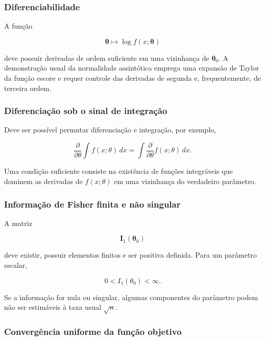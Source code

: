 \documentclass[
  letterpaper,
  DIV=11,
  numbers=noendperiod]{scrreprt}
\begin{document}
\subsubsection{Diferenciabilidade}\label{diferenciabilidade}

A função

\[\boldsymbol\theta
\longmapsto
\log f(x;\boldsymbol\theta)\]

deve possuir derivadas de ordem suficiente em uma vizinhança de
\(\boldsymbol\theta_0\). A demonstração usual da normalidade assintótica
emprega uma expansão de Taylor da função escore e requer controle das
derivadas de segunda e, frequentemente, de terceira ordem.

\subsubsection{Diferenciação sob o sinal de
integração}\label{diferenciauxe7uxe3o-sob-o-sinal-de-integrauxe7uxe3o}

Deve ser possível permutar diferenciação e integração, por exemplo,

\[\frac{\partial}{\partial\theta}
\int f(x;\theta)\,dx
=
\int
\frac{\partial}{\partial\theta}
f(x;\theta)\,dx.\]

Uma condição suficiente consiste na existência de funções integráveis
que dominem as derivadas de \(f(x;\theta)\) em uma vizinhança do
verdadeiro parâmetro.

\subsubsection{Informação de Fisher finita e não
singular}\label{informauxe7uxe3o-de-fisher-finita-e-nuxe3o-singular}

A matriz

\[\mathbf{I}_1(\boldsymbol\theta_0)\]

deve existir, possuir elementos finitos e ser positiva definida. Para um
parâmetro escalar,

\[0<I_1(\theta_0)<\infty.\]

Se a informação for nula ou singular, algumas componentes do parâmetro
podem não ser estimáveis à taxa usual \(\sqrt n\).

\subsubsection{Convergência uniforme da função
objetivo}\label{converguxeancia-uniforme-da-funuxe7uxe3o-objetivo}
\end{document}

